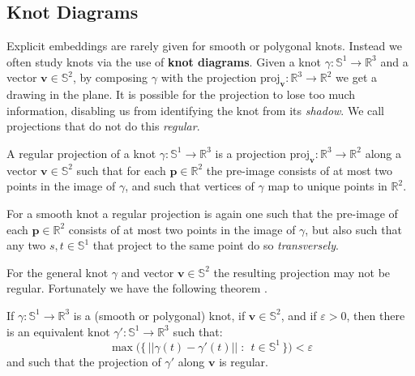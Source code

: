     \subsection{Knot Diagrams}
        Explicit embeddings are rarely given for smooth or polygonal knots.
        Instead we often study knots via the use of \textbf{knot diagrams}.
        Given a knot $\gamma:\mathbb{S}^{1}\rightarrow\mathbb{R}^{3}$ and a
        vector $\mathbf{v}\in\mathbb{S}^{2}$, by composing $\gamma$ with the
        projection
        $\textrm{proj}_{\mathbf{v}}:\mathbb{R}^{3}\rightarrow\mathbb{R}^{2}$ we
        get a drawing in the plane. It is possible for the projection to lose
        too much information, disabling us from identifying the knot from its
        \textit{shadow}. We call projections that do not do this
        \textit{regular}.
        \begin{definition}
            A regular projection of a knot
            $\gamma:\mathbb{S}^{1}\rightarrow\mathbb{R}^{3}$ is a projection
            $\textrm{proj}_{\mathbf{v}}:\mathbb{R}^{3}\rightarrow\mathbb{R}^{2}$
            along a vector $\mathbf{v}\in\mathbb{S}^{2}$ such that for each
            $\mathbf{p}\in\mathbb{R}^{2}$ the pre-image consists of at most two
            points in the image of $\gamma$, and such that vertices of
            $\gamma$ map to unique points in $\mathbb{R}^{2}$.
        \end{definition}
        For a smooth knot a regular projection is again one such that the
        pre-image of each $\mathbf{p}\in\mathbb{R}^{2}$ consists of at most two
        points in the image of $\gamma$, but also such that any two
        $s,t\in\mathbb{S}^{1}$ that project to the same point do so
        \textit{transversely}.
        \par\hfill\par
        For the general knot $\gamma$ and vector $\mathbf{v}\in\mathbb{S}^{2}$
        the resulting projection may not be regular. Fortunately we have the
        following theorem \cite[p.~22]{LivingstonKnotTheory}.
        \begin{theorem}
            If $\gamma:\mathbb{S}^{1}\rightarrow\mathbb{R}^{3}$ is a
            (smooth or polygonal) knot, if $\mathbf{v}\in\mathbb{S}^{2}$, and if
            $\varepsilon>0$, then there is an equivalent knot
            $\gamma':\mathbb{S}^{1}\rightarrow\mathbb{R}^{3}$ such that:
            \begin{equation}
                \max\big(
                    \{\,||\gamma(t)-\gamma'(t)||\;:\;\,t\in\mathbb{S}^{1}\,\}
                \big)<\varepsilon
            \end{equation}
            and such that the projection of $\gamma'$ along $\mathbf{v}$
            is regular.
        \end{theorem}
